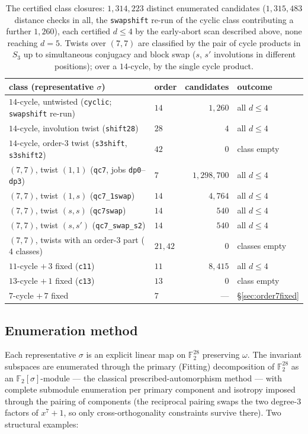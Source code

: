 \documentclass[11pt]{amsart}
\newcommand{\FF}{\mathbb{F}_{2}}
\theoremstyle{plain}
\theoremstyle{definition}
\theoremstyle{remark}
\begin{document}
\begin{table}[t]
\small
\begin{tabular}{llrl}
\toprule
class (representative $\sigma$) & order & candidates & outcome \\
\midrule
$14$-cycle, untwisted (\texttt{cyclic}; \texttt{swapshift} re-run) & $14$ & $1{,}260$ & all $d\le4$ \\
$14$-cycle, involution twist (\texttt{shift28}) & $28$ & $4$ & all $d\le4$ \\
$14$-cycle, order-$3$ twist (\texttt{s3shift}, \texttt{s3shift2}) & $42$ & $0$ & class empty \\
$(7,7)$, twist $(1,1)$ (\texttt{qc7}, jobs \texttt{dp0}--\texttt{dp3}) & $7$ & $1{,}298{,}700$ & all $d\le4$ \\
$(7,7)$, twist $(1,s)$ (\texttt{qc7\_1swap}) & $14$ & $4{,}764$ & all $d\le4$ \\
$(7,7)$, twist $(s,s)$ (\texttt{qc7swap}) & $14$ & $540$ & all $d\le4$ \\
$(7,7)$, twist $(s,s')$ (\texttt{qc7\_swap\_s2}) & $14$ & $540$ & all $d\le4$ \\
$(7,7)$, twists with an order-$3$ part ($4$ classes) & $21,42$ & $0$ & classes empty \\
$11$-cycle $+\,3$ fixed (\texttt{c11}) & $11$ & $8{,}415$ & all $d\le4$ \\
$13$-cycle $+\,1$ fixed (\texttt{c13}) & $13$ & $0$ & class empty \\
$7$-cycle $+\,7$ fixed & $7$ & --- & \S\ref{sec:order7fixed} \\
\bottomrule
\end{tabular}
\medskip
\caption{The certified class closures: $1{,}314{,}223$ distinct enumerated
candidates ($1{,}315{,}483$ distance checks in all, the \texttt{swapshift}
re-run of the cyclic class contributing a further $1{,}260$), each
certified $d\le4$ by the early-abort scan described above, none reaching
$d=5$. Twists over $(7,7)$ are classified by the pair
of cycle products in $S_{3}$ up to simultaneous conjugacy and block swap
($s$, $s'$ involutions in different positions); over a $14$-cycle, by the
single cycle product.}
\label{tab:classes}
\end{table}

\subsection{Enumeration method}
Each representative $\sigma$ is an explicit linear map on $\FF^{28}$
preserving $\omega$. The invariant subspaces are enumerated through the
primary (Fitting) decomposition of $\FF^{28}$ as an
$\FF[\sigma]$-module --- the classical prescribed-automorphism method
\cite{Huffman98} --- with complete submodule enumeration per primary
component and isotropy imposed through the pairing of components (the
reciprocal pairing swaps the two degree-$3$ factors of $x^{7}+1$, so only
cross-orthogonality constraints survive there). Two structural examples:
\end{document}
